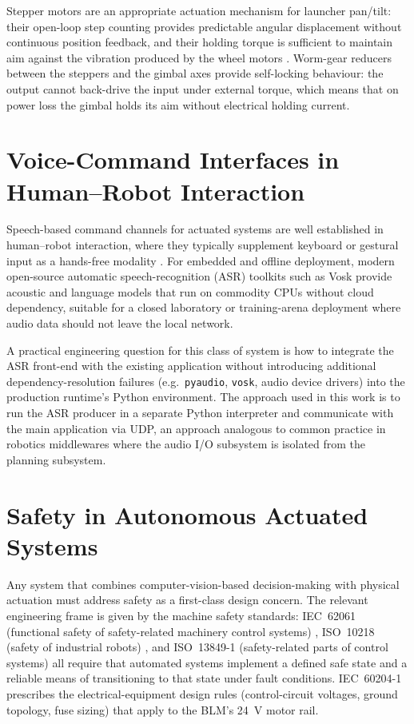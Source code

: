 Stepper motors are an appropriate actuation mechanism for launcher pan/tilt: their open-loop step counting provides predictable angular displacement without continuous position feedback, and their holding torque is sufficient to maintain aim against the vibration produced by the wheel motors \cite{ref20}. Worm-gear reducers between the steppers and the gimbal axes provide self-locking behaviour: the output cannot back-drive the input under external torque, which means that on power loss the gimbal holds its aim without electrical holding current.

\section{Voice-Command Interfaces in Human--Robot Interaction}

Speech-based command channels for actuated systems are well established in human--robot interaction, where they typically supplement keyboard or gestural input as a hands-free modality \cite{ref48_voice_hri}. For embedded and offline deployment, modern open-source automatic speech-recognition (ASR) toolkits such as Vosk \cite{ref41_vosk} provide acoustic and language models that run on commodity CPUs without cloud dependency, suitable for a closed laboratory or training-arena deployment where audio data should not leave the local network.

A practical engineering question for this class of system is how to integrate the ASR front-end with the existing application without introducing additional dependency-resolution failures (e.g.\ \texttt{pyaudio}, \texttt{vosk}, audio device drivers) into the production runtime's Python environment. The approach used in this work is to run the ASR producer in a separate Python interpreter and communicate with the main application via UDP, an approach analogous to common practice in robotics middlewares where the audio I/O subsystem is isolated from the planning subsystem.

\section{Safety in Autonomous Actuated Systems}

Any system that combines computer-vision-based decision-making with physical actuation must address safety as a first-class design concern. The relevant engineering frame is given by the machine safety standards: IEC~62061 (functional safety of safety-related machinery control systems) \cite{ref21}, ISO~10218 (safety of industrial robots) \cite{ref26}, and ISO~13849-1 (safety-related parts of control systems) \cite{ref44_iso13849} all require that automated systems implement a defined safe state and a reliable means of transitioning to that state under fault conditions. IEC~60204-1 \cite{ref45_iec60204} prescribes the electrical-equipment design rules (control-circuit voltages, ground topology, fuse sizing) that apply to the BLM's 24~V motor rail.

